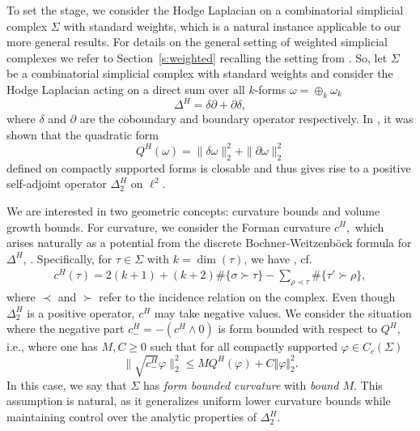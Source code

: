 \documentclass[10pt]{amsart}
\theoremstyle{definition}
\begin{document}
To set the stage, we consider the Hodge Laplacian on a combinatorial simplicial complex $\Sigma$  with standard weights, which is a natural instance applicable to our more general results. For details on the general setting of weighted simplicial complexes we refer to Section~\ref{s:weighted} recalling the setting from \cite{BK}.
So, let $  \Sigma$ be a %
combinatorial simplicial complex with standard weights
and consider the Hodge Laplacian acting on a direct sum over all 
$k$-forms $\omega=\oplus_{k}\omega_k$ %
\[\Delta^H = \delta\partial + \partial\delta,\]
where $\delta$ and $\partial$ are the coboundary and boundary operator respectively.
In \cite{BK}, it was shown that the quadratic form \[Q^H(\omega)=\|\delta \omega\|^2_2 + \|\partial \omega\|^2_2    \] defined on compactly supported forms is closable and thus gives rise to a positive self-adjoint operator $\Delta^H_2$ on $\ell^2$.

We are interested in two geometric concepts:  curvature bounds and volume growth bounds. For curvature, we consider the Forman curvature $c^H,$ which arises naturally as a potential from the discrete Bochner-Weitzenböck formula for $\Delta^H$, \cite{F}. Specifically, 
for $\tau\in  \Sigma$ with $k = \dim(\tau)$, we have , cf. \cite[Section~6.1]{BK}
\begin{align*}
	c^H(\tau)  = 2(k+1)+(k+2)\#\lbrace\sigma\succ\tau\rbrace-\sum_{\rho\prec\tau}\#\lbrace \tau'\succ \rho\rbrace,
\end{align*}
where $\prec$ and $\succ$ refer to the incidence relation on the complex.
Even though $\Delta^H_2$ is a positive operator, $c^H$ may take negative values. We consider the situation where the negative part $c^H_-= -(c^H \wedge 0)$ is form bounded with respect to $Q^H$, i.e., where one has $M,C\geq 0$ such that for all compactly supported $\varphi\in C_c(\Sigma)$
\begin{equation*}\label{cformbound}
     \| \sqrt{c_-^H}\varphi\|_2^2\leq M {Q}^H(\varphi)+C\Vert\varphi\Vert^2_2.
 \end{equation*}
In this case, we say that $\Sigma$ has \emph{form bounded curvature} with \emph{bound $M$}.  This assumption is natural, as it generalizes uniform lower curvature bounds while maintaining control over the analytic properties of $\Delta^H_2$.
\end{document}
